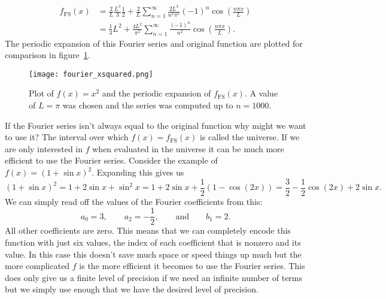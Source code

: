 \documentclass[a4paper]{article}
\newcommand{\FS}{{\mathrm{FS}}}
\begin{document}
    \begin{align*}
        f_\FS(x) &= \frac{2}{L}\frac{L^3}{3}\frac{1}{2} + \frac{2}{L}\sum_{n=1}^{\infty}\frac{2L^3}{n^2\pi^2}(-1)^n\cos\left(\frac{n\pi x}{L}\right)\\
        &= \frac{1}{3}L^2 + \frac{4L^2}{\pi^2}\sum_{n=1}^{\infty}\frac{(-1)^n}{n^2}\cos\left(\frac{n\pi x}{L}\right).
    \end{align*}
    The periodic expansion of this Fourier series and original function are plotted for comparison in figure~\ref{fig:fourier series x^2}.
    \begin{figure}[ht]
        \centering
        \texttt{[image: fourier\_xsquared.png]}
        \caption{Plot of \(f(x) = x^2\) and the periodic expansion of \(f_\FS(x)\). A value of \(L = \pi\) was chosen and the series was computed up to \(n = 1000\).}
        \label{fig:fourier series x^2}
    \end{figure}

    If the Fourier series isn't always equal to the original function why might we want to use it?
    The interval over which \(f(x) = f_\FS(x)\) is called the universe.
    If we are only interested in \(f\) when evaluated in the universe it can be much more efficient to use the Fourier series.
    Consider the example of \(f(x) = (1 + \sin x)^2.\)
    Expanding this gives us
    \[(1 + \sin x)^2 = 1 + 2\sin x + \sin^2x = 1 + 2\sin x + \frac{1}{2}(1 - \cos(2x)) = \frac{3}{2} - \frac{1}{2}\cos(2x) + 2\sin x.\]
    We can simply read off the values of the Fourier coefficients from this:
    \[a_0 = 3,\qquad a_2 = -\frac{1}{2},\qquad\text{and}\qquad b_1 = 2.\]
    All other coefficients are zero.
    This means that we can completely encode this function with just six values, the index of each coefficient that is nonzero and its value.
    In this case this doesn't save much space or speed things up much but the more complicated \(f\) is the more efficient it becomes to use the Fourier series.
    This does only give us a finite level of precision if we need an infinite number of terms but we simply use enough that we have the desired level of precision.
    
\end{document}
